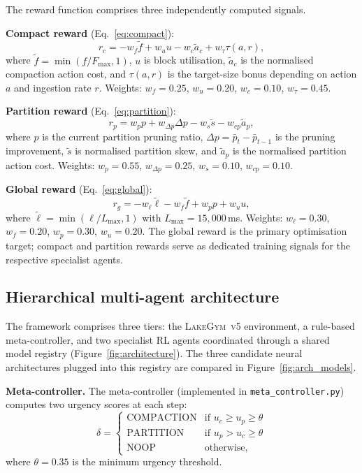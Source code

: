\documentclass[fleqn,10pt]{wlscirep}
\newcommand{\env}{\textsc{LakeGym~v5}}
\begin{document}
The reward function comprises three independently computed signals.

\textbf{Compact reward} (Eq.~\ref{eq:compact}):
\begin{equation}
r_c = -w_f \tilde{f} + w_u u - w_c \tilde{a}_c + w_\tau \tau(a, r),
\label{eq:compact}
\end{equation}
where $\tilde{f} = \min(f / F_{\max}, 1)$, $u$ is block utilisation,
$\tilde{a}_c$ is the normalised compaction action cost, and
$\tau(a, r)$ is the target-size bonus depending on action $a$ and
ingestion rate $r$. Weights: $w_f = 0.25$, $w_u = 0.20$,
$w_c = 0.10$, $w_\tau = 0.45$.

\textbf{Partition reward} (Eq.~\ref{eq:partition}):
\begin{equation}
r_p = w_p p + w_{\Delta p} \Delta p - w_s \tilde{s}
    - w_{cp} \tilde{a}_p,
\label{eq:partition}
\end{equation}
where $p$ is the current partition pruning ratio,
$\Delta p = \bar{p}_t - \bar{p}_{t-1}$ is the pruning improvement,
$\tilde{s}$ is normalised partition skew, and $\tilde{a}_p$ is the
normalised partition action cost. Weights: $w_p = 0.55$,
$w_{\Delta p} = 0.25$, $w_s = 0.10$, $w_{cp} = 0.10$.

\textbf{Global reward} (Eq.~\ref{eq:global}):
\begin{equation}
r_g = -w_\ell \tilde{\ell} - w_f \tilde{f} + w_p p + w_u u,
\label{eq:global}
\end{equation}
where $\tilde{\ell} = \min(\ell / L_{\max}, 1)$ with
$L_{\max} = 15{,}000$\,ms. Weights: $w_\ell = 0.30$, $w_f = 0.20$,
$w_p = 0.30$, $w_u = 0.20$. The global reward is the primary
optimisation target; compact and partition rewards serve as dedicated
training signals for the respective specialist agents.

\FloatBarrier

\subsection*{Hierarchical multi-agent architecture}

The framework comprises three tiers: the \env{} environment, a
rule-based meta-controller, and two specialist RL agents coordinated
through a shared model registry (Figure~\ref{fig:architecture}).
The three candidate neural architectures plugged into this registry
are compared in Figure~\ref{fig:arch_models}.

\textbf{Meta-controller.}
The meta-controller (implemented in \texttt{meta\_controller.py})
computes two urgency scores at each step:
\begin{equation}
\delta = \begin{cases}
\text{COMPACTION} & \text{if } u_c \geq u_p \geq \theta \\
\text{PARTITION}  & \text{if } u_p > u_c \geq \theta \\
\text{NOOP}       & \text{otherwise,}
\end{cases}
\end{equation}
where $\theta = 0.35$ is the minimum urgency threshold.
\end{document}
